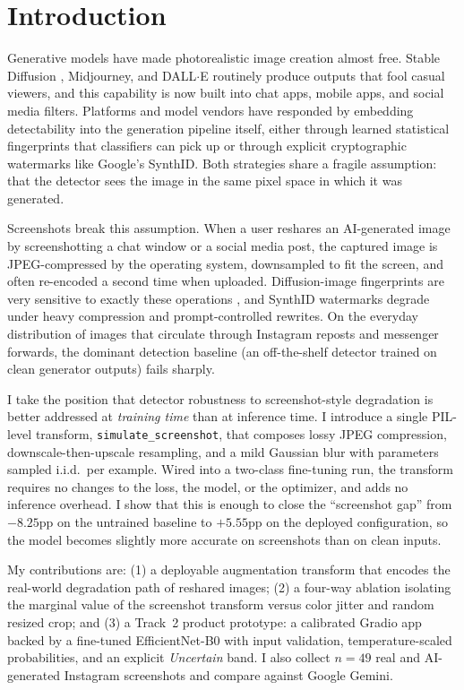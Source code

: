 \documentclass{article}
\begin{document}
\section{Introduction}
\label{sec:intro}

Generative models have made photorealistic image creation almost free.
Stable Diffusion \citep{rombach2022ldm}, Midjourney, and
DALL$\cdot$E routinely produce outputs that fool casual viewers, and
this capability is now built into chat apps, mobile apps, and social
media filters. Platforms and model vendors have responded by
embedding detectability into the generation pipeline itself, either
through learned statistical fingerprints that classifiers can pick up
\citep{wang2020cnngenerated,frank2020frequency} or through explicit
cryptographic watermarks like Google's SynthID. Both strategies share
a fragile assumption: that the detector sees the image in the same
pixel space in which it was generated.

Screenshots break this assumption. When a user reshares an
AI-generated image by screenshotting a chat window or a social media
post, the captured image is JPEG-compressed by the operating system,
downsampled to fit the screen, and often re-encoded a second time
when uploaded. Diffusion-image fingerprints are very sensitive to
exactly these operations \citep{corvi2023diffusion}, and SynthID
watermarks degrade under heavy compression and prompt-controlled
rewrites. On the everyday distribution of images that circulate
through Instagram reposts and messenger forwards, the dominant
detection baseline (an off-the-shelf detector trained on clean
generator outputs) fails sharply.

I take the position that detector robustness to screenshot-style
degradation is better addressed at \emph{training time} than at
inference time. I introduce a single PIL-level transform,
\texttt{simulate\_screenshot}, that composes lossy JPEG compression,
downscale-then-upscale resampling, and a mild Gaussian blur with
parameters sampled i.i.d.\ per example. Wired into a two-class
fine-tuning run, the transform requires no changes to the loss, the
model, or the optimizer, and adds no inference overhead. I show that
this is enough to close the ``screenshot gap'' from $-8.25$pp on the
untrained baseline to $+5.55$pp on the deployed configuration, so
the model becomes slightly more accurate on screenshots than on
clean inputs.

My contributions are: (1) a deployable augmentation transform that
encodes the real-world degradation path of reshared images; (2) a
four-way ablation isolating the marginal value of the screenshot
transform versus color jitter and random resized crop; and (3) a
Track~2 product prototype: a calibrated Gradio app backed by a
fine-tuned EfficientNet-B0 with input validation,
temperature-scaled probabilities, and an explicit \emph{Uncertain}
band. I also collect $n=49$ real and AI-generated Instagram
screenshots and compare against Google Gemini.
\end{document}
